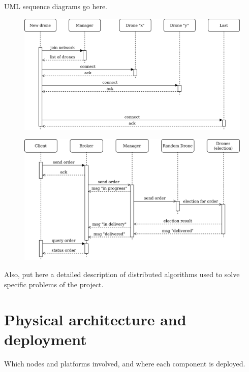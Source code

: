 \documentclass[a4paper, oneside]{memoir}
\begin{document}
UML sequence diagrams go here.
\begin{figure}[h!]
	\centering
	\includegraphics[width=\linewidth]{New-drone}
\end{figure}

\begin{figure}[h!]
	\centering
	\includegraphics[width=\linewidth]{New-order}
\end{figure}

Also, put here a detailed description of distributed algorithms used to solve specific problems of the project.

\section{Physical architecture and deployment}
Which nodes and platforms involved, and where each component is deployed.
\end{document}
